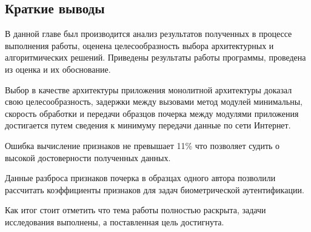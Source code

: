 \subsection{Краткие выводы}
В данной главе был производится анализ результатов полученных в процессе выполнения работы, оценена целесообразность выбора архитектурных и алгоритмических решений. Приведены результаты работы программы, проведена из оценка и их обоснование.

Выбор в качестве архитектуры приложения монолитной архитектуры доказал свою целесообразность, задержки между вызовами метод модулей минимальны, скорость обработки и передачи образцов почерка между модулями приложения достигается путем сведения к минимуму передачи данные по сети Интернет.

Ошибка вычисление признаков не превышает 11\% что позволяет судить о высокой достоверности полученных данных.

Данные разброса признаков почерка в образцах одного автора позволили рассчитать коэффициенты признаков для задач биометрической \mbox{аутентификации.}

Как итог стоит отметить что тема работы полностью раскрыта, задачи исследования выполнены, а  поставленная цель достигнута.